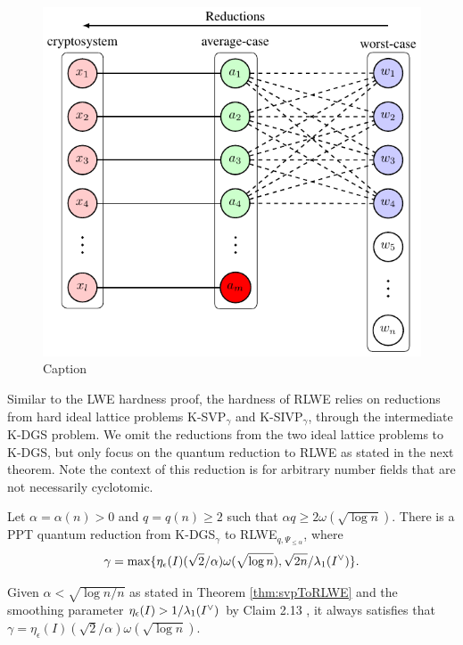 \documentclass[../main.tex]{subfiles}
\begin{document}
\begin{figure}[hbt!]
    \centering
    \includegraphics[page=17]{images/Lattice_crypto_tikz_folder.pdf}
    \caption{Caption}
    \label{fig:rlweReduction}
\end{figure}

Similar to the LWE hardness proof, the hardness of RLWE relies on reductions from hard ideal lattice problems K-SVP$_\gamma$ and K-SIVP$_\gamma$, through the intermediate K-DGS problem. We omit the reductions from the two ideal lattice problems to K-DGS, but only focus on the quantum reduction to RLWE as stated in the next theorem. Note the context of this reduction is for arbitrary number fields that are not necessarily cyclotomic. 

\begin{theorem}
\label{thm:rlweIter}
\reversemarginpar
{}
Let $\alpha=\alpha(n)>0$ and $q=q(n) \ge 2$ such that $\alpha q \ge 2 \omega(\sqrt{\log n})$. There is a PPT quantum reduction from K-DGS$_{\gamma}$ to RLWE$_{q,\Psi_{\le \alpha}}$, where 
\begin{equation}
\label{equ:gamma}
    \gamma = \max\{\eta_{\epsilon}(I) (\sqrt{2}/\alpha) \omega(\sqrt{\log n}), \sqrt{2n}/\lambda_1(I^{\vee})\}.
\end{equation}
\end{theorem}

Given $\alpha < \sqrt{\log n / n}$ as stated in Theorem \ref{thm:svpToRLWE} and the smoothing parameter $\eta_{\epsilon}(I) > 1/ \lambda_1(I^{\vee})$ by Claim 2.13 \cite{regev2009lattices}, it always satisfies that $\gamma =\eta_{\epsilon}(I) (\sqrt{2}/\alpha) \omega(\sqrt{\log n})$. 
\end{document}
